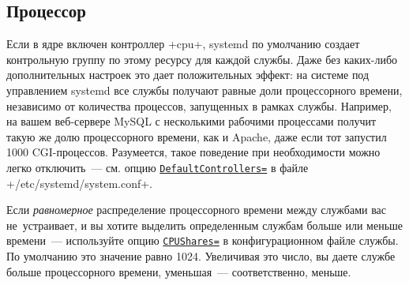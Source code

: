 \documentclass[10pt,oneside,a4paper]{article}
\newcommand{\hreftt}[2]{\href{#1}{\texttt{#2}}}
\begin{document}
\subsection{Процессор}

Если в ядре включен контроллер +cpu+, systemd по умолчанию создает контрольную
группу по этому ресурсу для каждой службы. Даже без каких-либо дополнительных
настроек это дает положительных эффект: на системе под управлением systemd все
службы получают равные доли процессорного времени, независимо от количества
процессов, запущенных в рамках службы. Например, на вашем веб-сервере MySQL с
несколькими рабочими процессами получит такую же долю процессорного времени,
как и Apache, даже если тот запустил 1000 CGI-процессов. Разумеется, такое
поведение при необходимости можно легко отключить~--- см. опцию
\hreftt{http://www.freedesktop.org/software/systemd/man/systemd-system.conf.html}%
{DefaultControllers=} в файле +/etc/systemd/system.conf+.

Если \emph{равномерное} распределение процессорного времени между службами вас
не~устраивает, и вы хотите выделить определенным службам больше или меньше
времени~--- используйте опцию
\hreftt{http://www.freedesktop.org/software/systemd/man/systemd.resource-control.html}%
{CPUShares=} в конфигурационном файле службы. По умолчанию это значение равно
1024. Увеличивая это число, вы даете службе больше процессорного времени,
уменьшая~--- соответственно, меньше.
\end{document}
